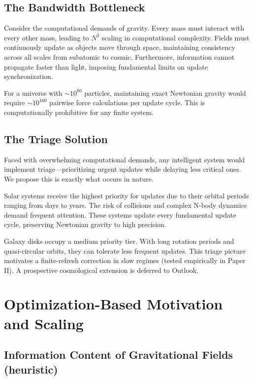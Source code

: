 \documentclass[usenatbib]{mnras}
\begin{document}
\subsection{The Bandwidth Bottleneck}

Consider the computational demands of gravity. Every mass must interact with every other mass, leading to $N^2$ scaling in computational complexity. Fields must continuously update as objects move through space, maintaining consistency across all scales from subatomic to cosmic. Furthermore, information cannot propagate faster than light, imposing fundamental limits on update synchronization.

For a universe with $\sim 10^{80}$ particles, maintaining exact Newtonian gravity would require $\sim 10^{160}$ pairwise force calculations per update cycle. This is computationally prohibitive for any finite system.

\subsection{The Triage Solution}

Faced with overwhelming computational demands, any intelligent system would implement triage---prioritizing urgent updates while delaying less critical ones. We propose this is exactly what occurs in nature.

Solar systems receive the highest priority for updates due to their orbital periods ranging from days to years. The risk of collisions and complex N-body dynamics demand frequent attention. These systems update every fundamental update cycle, preserving Newtonian gravity to high precision.

Galaxy disks occupy a medium priority tier. With long rotation periods and quasi-circular orbits, they can tolerate less frequent updates. This triage picture motivates a finite-refresh correction in slow regimes (tested empirically in Paper II). A prospective cosmological extension is deferred to Outlook.

\section{Optimization-Based Motivation and Scaling}
\label{sec:derivation}

\subsection{Information Content of Gravitational Fields (heuristic)}
\end{document}
